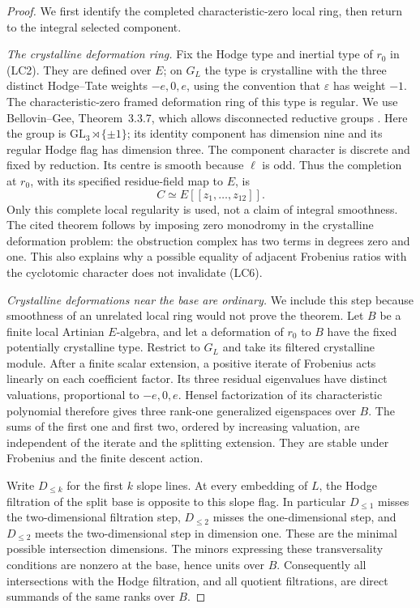 \begin{proof}
We first identify the completed characteristic-zero local ring, then
return to the integral selected component.

\emph{The crystalline deformation ring.}
Fix the Hodge type and inertial type of $r_0$ in (LC2).  They are
defined over $E$; on $G_L$ the type is crystalline with the three
distinct Hodge--Tate weights $-e,0,e$, using the convention that
$\varepsilon$ has weight $-1$.  The characteristic-zero framed
deformation ring of this type is regular.  We use
Bellovin--Gee, Theorem~3.3.7, which allows disconnected reductive
groups \cite{support-local-chart-BG}.  Here the group is
$\mathrm{GL}_3\rtimes\{\pm1\}$; its identity component has
dimension nine and its regular Hodge flag has dimension three.
The component character is discrete and fixed by reduction.  Its
centre is smooth because $\ell$ is odd.  Thus the completion at
$r_0$, with its specified residue-field map to $E$, is
\[
                         C\simeq E[[z_1,\ldots,z_{12}]].       \tag{LC6}
\]
Only this complete local regularity is used, not a claim of integral
smoothness.  The cited theorem follows by imposing zero monodromy
in the crystalline deformation problem: the obstruction complex has
two terms in degrees zero and one.  This also explains why a possible
equality of adjacent Frobenius ratios with the cyclotomic character
does not invalidate (LC6).

\emph{Crystalline deformations near the base are ordinary.}
We include this step because smoothness of an unrelated local ring
would not prove the theorem.  Let $B$ be a finite local Artinian
$E$-algebra, and let a deformation of $r_0$ to $B$ have the fixed
potentially crystalline type.  Restrict to $G_L$ and take its filtered
crystalline module.  After a finite scalar extension, a positive
iterate of Frobenius acts linearly on each coefficient factor.  Its
three residual eigenvalues have distinct valuations, proportional to
$-e,0,e$.  Hensel factorization of its characteristic polynomial
therefore gives three rank-one generalized eigenspaces over $B$.
The sums of the first one and first two, ordered by increasing
valuation, are independent of the iterate and the splitting extension.
They are stable under Frobenius and the finite descent action.

Write $D_{\le k}$ for the first $k$ slope lines.  At every embedding
of $L$, the Hodge filtration of the split base is opposite to this
slope flag.  In particular $D_{\le1}$ misses the two-dimensional
filtration step, $D_{\le2}$ misses the one-dimensional step, and
$D_{\le2}$ meets the two-dimensional step in dimension one.
These are the minimal possible intersection dimensions.  The minors
expressing these transversality conditions are nonzero at the base,
hence units over $B$.  Consequently all intersections with the Hodge
filtration, and all quotient filtrations, are direct summands of the
same ranks over $B$.


\end{proof}
